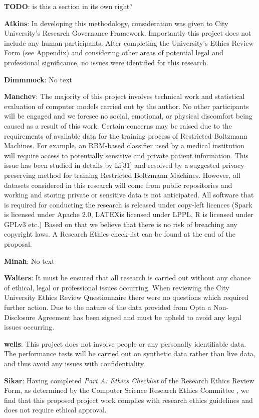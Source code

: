 \textbf{TODO}: is this a section in its own right?  

\textbf{Atkins}: In developing this methodology, consideration was given to City University’s Research
Governance Framework. Importantly this project does not include any human participants.
After completing the University’s Ethics Review Form (see Appendix) and considering other
areas of potential legal and professional significance, no issues were identified for this
research.

\textbf{Dimmmock}: No text  

\textbf{Manchev}: The majority of this project involves technical work and statistical evaluation of computer
models carried out by the author. No other participants will be engaged and we foresee no
social, emotional, or physical discomfort being caused as a result of this work.
Certain concerns may be raised due to the requirements of available data for the training
process of Restricted Boltzmann Machines. For example, an RBM-based classifier used by a medical institution will require access to potentially sensitive and private patient information.
This issue has been studied in details by Li[31] and resolved by a suggested privacy-preserving
method for training Restricted Boltzmann Machines. However, all datasets considered in this
research will come from public repositories and working and storing private or sensitive data is
not anticipated.
All software that is required for conducting the research is released under copy-left licences
(Spark is licensed under Apache 2.0, LATEXis licensed under LPPL, R is licensed under GPLv3
etc.) Based on that we believe that there is no risk of breaching any copyright laws.
A Research Ethics check-list can be found at the end of the proposal.  

\textbf{Minah}: No text  

\textbf{Walters}: It must be ensured that all research is carried out without any chance of ethical, legal or
professional issues occurring. When reviewing the City University Ethics Review
Questionnaire there were no questions which required further action. Due to the nature of the
data provided from Opta a Non-Disclosure Agreement has been signed and must be upheld to
avoid any legal issues occurring.    


\textbf{wells}: This project does not involve people or any personally identifiable data. The performance tests will
be carried out on synthetic data rather than live data, and thus avoid any issues with confidentiality.

\textbf{Sikar}: Having completed \textit{Part A: Ethics Checklist} of the Research Ethics Review Form, as determined by the Computer Science Research Ethics Committee \cite{CSREC:2020}, we find that this proposed project work complies with research ethics guidelines and does not require ethical approval. 